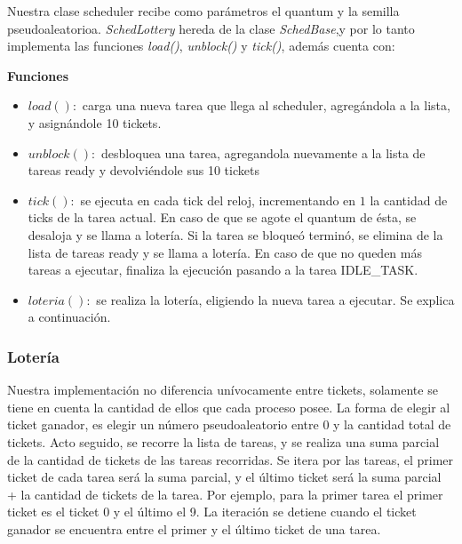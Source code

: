 \vspace{2mm}

Nuestra clase scheduler recibe como par\'ametros el quantum y la semilla pseudoaleatorioa. \textit{SchedLottery} hereda de la clase \textit{SchedBase},y por lo tanto implementa las funciones \textit{load()}, \textit{unblock()} y \textit{tick()}, adem\'as cuenta con:

\vspace{2mm}

\textbf{Funciones}

\begin{itemize}

\item $load():$ carga una nueva tarea que llega al scheduler, agreg\'andola a la lista, y asign\'andole 10 tickets.

\item $unblock(): $ desbloquea una tarea, agregandola nuevamente a la lista de tareas ready y devolvi\'endole sus 10 tickets

\item $tick(): $ se ejecuta en cada tick del reloj, incrementando en $1$ la cantidad de ticks de la tarea actual. En caso de que se agote el quantum de \'esta, se desaloja y se llama a loter\'ia. Si la tarea se bloque\'o termin\'o, se elimina de la lista de tareas ready y se llama a loter\'ia. En caso de que no queden m\'as tareas a ejecutar, finaliza la ejecuci\'on pasando a la tarea IDLE\_TASK.
\item $loteria(): $ se realiza la loter\'ia, eligiendo la nueva tarea a ejecutar. Se explica a continuaci\'on.

\end{itemize}

\subsubsection{Loter\'ia}

Nuestra implementaci\'on no diferencia un\'ivocamente entre tickets, solamente se tiene en cuenta la cantidad de ellos que cada proceso posee. La forma de elegir al ticket ganador, es elegir un n\'umero pseudoaleatorio entre 0 y la cantidad total de tickets. Acto seguido, se recorre la lista de tareas, y se realiza una suma parcial de la cantidad de tickets de las tareas recorridas. Se itera por las tareas, el primer ticket de cada tarea ser\'a la suma parcial, y el \'ultimo ticket ser\'a la suma parcial + la cantidad de tickets de la tarea. Por ejemplo, para la primer tarea el primer ticket es el ticket 0 y el \'ultimo el 9. La iteraci\'on se detiene cuando el ticket ganador se encuentra entre el primer y el \'ultimo ticket de una tarea.

